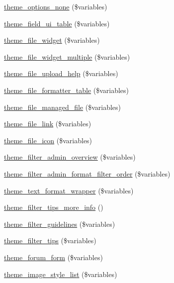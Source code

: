 \begin{DoxyCompactItemize}
\item 
\hyperlink{group__themeable_gac1e1ed5c70484046a550344155a9bf6d}{theme\_\-options\_\-none} (\$variables)
\item 
\hyperlink{group__themeable_gae4055bc790361b3cb3e6edd36712243d}{theme\_\-field\_\-ui\_\-table} (\$variables)
\item 
\hyperlink{group__themeable_ga9055faf2be0e1a9f7c75a5f981a4efa7}{theme\_\-file\_\-widget} (\$variables)
\item 
\hyperlink{group__themeable_ga56ddebb122d3e6e5a16783ccbf27fbfc}{theme\_\-file\_\-widget\_\-multiple} (\$variables)
\item 
\hyperlink{group__themeable_gaddc2762286376b44aa1a4ca0ce9e1a6e}{theme\_\-file\_\-upload\_\-help} (\$variables)
\item 
\hyperlink{group__themeable_ga4c35503833fe7ebd0d012e2da75fd4e1}{theme\_\-file\_\-formatter\_\-table} (\$variables)
\item 
\hyperlink{group__themeable_ga4a224a07d1150f036feea621eb99fbe5}{theme\_\-file\_\-managed\_\-file} (\$variables)
\item 
\hyperlink{group__themeable_ga09a17231e69397fafde06db8db4f476f}{theme\_\-file\_\-link} (\$variables)
\item 
\hyperlink{group__themeable_ga7807f8ee7d081b9d1f7a9f96f7b0a52c}{theme\_\-file\_\-icon} (\$variables)
\item 
\hyperlink{group__themeable_ga8616d9e341ab5e1466cbbf8111c172d2}{theme\_\-filter\_\-admin\_\-overview} (\$variables)
\item 
\hyperlink{group__themeable_ga4abf76fee40295b66872dfa398ab1319}{theme\_\-filter\_\-admin\_\-format\_\-filter\_\-order} (\$variables)
\item 
\hyperlink{group__themeable_gadfd0e06f1e78fbc4f260b84872e1911e}{theme\_\-text\_\-format\_\-wrapper} (\$variables)
\item 
\hyperlink{group__themeable_ga433eeac690ffb684b845d10b301fdbca}{theme\_\-filter\_\-tips\_\-more\_\-info} ()
\item 
\hyperlink{group__themeable_ga1c1be7f8ecbe9bff3d03674a3c4e50ed}{theme\_\-filter\_\-guidelines} (\$variables)
\item 
\hyperlink{group__themeable_ga573322311613c1d8f1de3ff1eb8a7af8}{theme\_\-filter\_\-tips} (\$variables)
\item 
\hyperlink{group__themeable_ga32e5ebb6f4e42f0e96175e6c11fb66d1}{theme\_\-forum\_\-form} (\$variables)
\item 
\hyperlink{group__themeable_gaa215d56002640f64d6fc84311b18c116}{theme\_\-image\_\-style\_\-list} (\$variables)

\end{DoxyCompactItemize}
